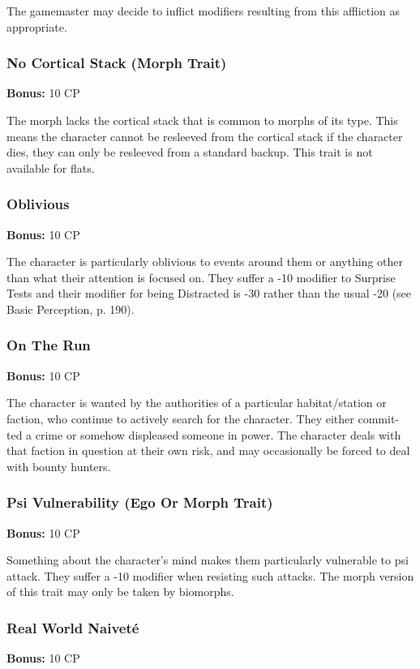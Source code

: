 The gamemaster may decide to inflict modifiers resulting from this affliction
as appropriate.

\subsubsection{No Cortical Stack (Morph Trait)}
\textbf{Bonus:} 10 CP

The morph lacks the cortical stack that is common to morphs of its type. This
means the character cannot be resleeved from the cortical stack if the
character dies, they can only be resleeved from a standard backup. This trait
is not available for flats.

\subsubsection{Oblivious}
\textbf{Bonus:} 10 CP

The character is particularly oblivious to events around them or anything other
than what their attention is focused on. They suffer a -10 modifier to Surprise
Tests and their modifier for being Distracted is -30 rather than the usual -20
(see Basic Perception, p. 190).

\subsubsection{On The Run}
\textbf{Bonus:} 10 CP

The character is wanted by the authorities of a particular habitat/station or
faction, who continue to actively search for the character. They either commit-
ted a crime or somehow displeased someone in power.  The character deals with
that faction in question at their own risk, and may occasionally be forced to
deal with bounty hunters.

\subsubsection{Psi Vulnerability (Ego Or Morph Trait)}
\textbf{Bonus:} 10 CP

Something about the character’s mind makes them particularly vulnerable to psi
attack. They suffer a -10 modifier when resisting such attacks.  The morph
version of this trait may only be taken by biomorphs.

\subsubsection{Real World Naiveté}
\textbf{Bonus:} 10 CP

